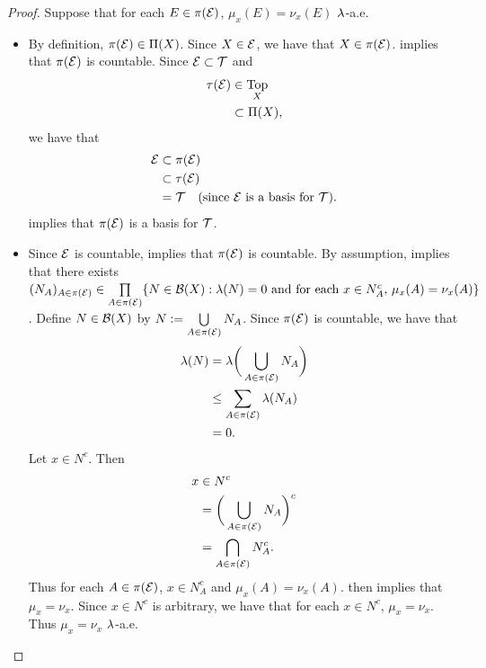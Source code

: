 \documentclass{book}
\begin{document}
	\begin{proof}
		Suppose that for each $E \in \pi(\mathcal{E})$, $\mu_x(E) = \nu_x(E)$ $\lambda$-a.e.
		\begin{itemize}
			\item By definition, $\pi(\mathcal{E}) \in \Pi(X)$. Since $X \in \mathcal{E}$, we have that $X \in \pi(\mathcal{E})$.  implies that $\pi(\mathcal{E})$ is countable.
			Since $\mathcal{E} \subset \mathcal{T}$ and 
			\begin{align*}
				\tau(\mathcal{E})
				& \in \operatorname*{\text{Top}}_X \\
				& \subset \Pi(X),
			\end{align*}
			we have that 
			\begin{align*}
				\mathcal{E}
				& \subset \pi(\mathcal{E}) \\
				& \subset \tau(\mathcal{E}) \\
				& = \mathcal{T} \quad \text{(since $\mathcal{E}$ is a basis for $\mathcal{T}$)}.
			\end{align*}
			 implies that $\pi(\mathcal{E})$ is a basis for $\mathcal{T}$. 
			\item Since $\mathcal{E}$ is countable,  implies that $\pi(\mathcal{E})$ is countable. By assumption,  implies that there exists $(N_A)_{A \in \pi(\mathcal{E})} \in \prod\limits_{A \in \pi(\mathcal{E})} \{N \in \mathcal{B}(X): \text{$\lambda(N) = 0$ and for each $x \in N_A^c$, $\mu_x(A) = \nu_x(A)$} \}$. Define $N \in \mathcal{B}(X)$ by $N \vcentcolon= \bigcup\limits_{A \in \pi(\mathcal{E})} N_A$. Since $\pi(\mathcal{E})$ is countable, we have that  
			\begin{align*}
				\lambda(N) 
				& = \lambda \bigg( \bigcup\limits_{A \in \pi(\mathcal{E})} N_A \bigg) \\
				& \leq \sum\limits_{A \in \pi(\mathcal{E})} \lambda(N_A) \\
				& = 0.
			\end{align*}
			Let $x \in N^c$. Then  
			\begin{align*}
				x 
				& \in N^c \\
				& = \bigg( \bigcup\limits_{A \in \pi(\mathcal{E})} N_A \bigg)^c \\
				& = \bigcap\limits_{A \in \pi(\mathcal{E})} N_A^c. 
			\end{align*}
			Thus for each $A \in \pi(\mathcal{E})$, $x \in N_A^c$ and $\mu_x(A) = \nu_x(A)$.  then implies that $\mu_x = \nu_x$. Since $x \in N^c$ is arbitrary, we have that for each $x \in N^c$, $\mu_x = \nu_x$. Thus $\mu_x = \nu_x$ $\lambda$-a.e.
		\end{itemize}
	\end{proof}
\end{document}
